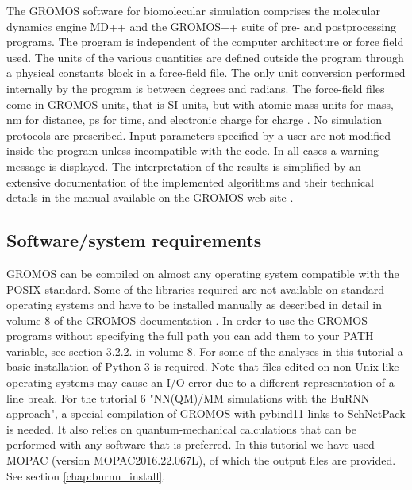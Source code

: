 The GROMOS software for biomolecular simulation comprises the molecular dynamics engine MD++ and the \linebreak GROMOS++ suite of pre- and postprocessing programs. The program is independent of the computer architecture or force field used. 
The units of the various quantities are defined outside the program through a physical constants block in a force-field file. The only unit conversion performed internally by the program is between degrees and radians. The force-field files come 
in GROMOS units, that is SI units, but with atomic mass units for mass, nm for distance, ps for time, and electronic charge for charge \cite{volume_6}. No simulation protocols are prescribed. 
Input parameters specified by a user are not modified inside 
the program unless incompatible with the code. In all cases a warning message is displayed. The interpretation of the results is simplified by an extensive 
documentation of the implemented algorithms and their technical details 
in the manual available on the GROMOS web site \cite{volume_6,volume_2}.

\subsection{Software/system requirements}
%
GROMOS can be compiled on almost any operating system compatible with the POSIX standard.
 Some of the libraries required are not available on standard operating systems and have to be installed 
manually as described in detail in volume 8 of the GROMOS documentation \cite{volume_8}. 
In order to use the GROMOS programs without specifying the full path you can add them to your PATH variable, see section 3.2.2. in volume 8.
For some of the analyses in this tutorial a basic installation of Python 3 is required. 
Note that files edited on non-Unix-like operating systems may cause an I/O-error due to a different representation of a line break. For the tutorial 6 "NN(QM)/MM simulations with the BuRNN approach", a special compilation of GROMOS with pybind11 links to SchNetPack is needed. It also relies on quantum-mechanical calculations that can be performed with any software that is preferred. In this tutorial we have used MOPAC (version MOPAC2016.22.067L), of which the output files are provided. See section \ref{chap:burnn_install}. 

